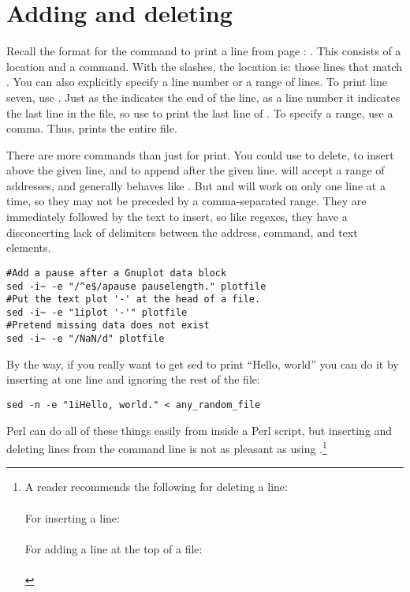 

\section{Adding and deleting}

Recall the format for the command to print a line from page
\pageref{sedintro}: . This consists of a location and a
command. With the slashes, the location is: those lines that match
. You can also explicitly specify a line number or a range
of lines. To print line seven, use . Just as the \ci{\$} indicates the
end of the line, as a line number it indicates the last line in the
file, so use  to print the last line of
.  To specify a range, use a comma. Thus, 
 prints the entire file.

There are more commands than just  for print. You could use 
to delete,  to insert above the given line, and  to append
after the given line.  will accept a range of
addresses, and generally behaves like .
But  and  will work on only one line at a time, so they may
not be preceded by a comma-separated range. They are immediately followed
by the text to insert, so like regexes, they have a disconcerting lack of
delimiters between the address, command, and text elements.

\begin{lstlisting}
#Add a pause after a Gnuplot data block
sed -i~ -e "/^e$/apause pauselength." plotfile
#Put the text plot '-' at the head of a file.
sed -i~ -e "1iplot '-'" plotfile
#Pretend missing data does not exist
sed -i~ -e "/NaN/d" plotfile
\end{lstlisting}

By the way, if you really want to get sed to print ``Hello, world'' you
can do it by inserting at one line and ignoring the rest of the file:
\begin{lstlisting}
sed -n -e "1iHello, world." < any_random_file
\end{lstlisting}

Perl can do all of these things easily from inside a Perl script,
but inserting and deleting lines from the command line is not as
pleasant as using .\footnote{\label{dchperl}
A reader recommends the following for deleting a line:\\
        \\
For inserting a line:\\
        \\
For adding a line at the top of a file:\\
        \\
}


